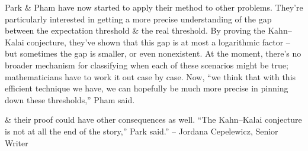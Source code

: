 \documentclass[oneside]{book}
\numberwithin{equation}{section}
\begin{document}
Park \& Pham have now started to apply their method to other problems. They're particularly interested in getting a more precise understanding of the gap between the expectation threshold \& the real threshold. By proving the Kahn--Kalai conjecture, they've shown that this gap is at most a logarithmic factor -- but sometimes the gap is smaller, or even nonexistent. At the moment, there's no broader mechanism for classifying when each of these scenarios might be true; mathematicians have to work it out case by case. Now, ``we think that with this efficient technique we have, we can hopefully be much more precise in pinning down these thresholds,'' Pham said.

\& their proof could have other consequences as well. ``The Kahn--Kalai conjecture is not at all the end of the story,'' Park said.'' -- Jordana Cepelewicz, Senior Writer


\begin{thebibliography}{99}
	\bibitem[]{}
\end{thebibliography}


\printbibliography[heading=bibintoc]
	
\end{document}
